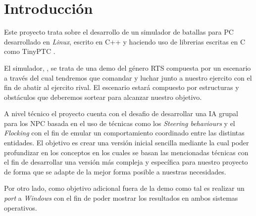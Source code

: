 \chapter{Introducción}
\label{intro}
Este proyecto trata sobre el desarrollo de un simulador de batallas para \ac{PC}
desarrollado en \textit{Linux}, escrito en C++ y haciendo uso de librerias escritas en
C como TinyPTC .

El simulador, , se trata de una demo del género \ac{RTS}
compuesta por un escenario a través del cual tendremos que comandar y luchar junto a
nuestro ejercito con el fin de abatir al ejercito rival. El escenario estará compuesto
por estructuras y obstáculos que deberemos sortear para alcanzar nuestro objetivo.

A nivel técnico el proyecto cuenta con el desafio de desarrollar una \ac{IA} grupal
para los \ac{NPC} basada en el uso de técnicas como los \textit{Steering behaviours} 
y el \textit{Flocking} con el fin de emular un comportamiento coordinado entre las
distintas entidades. El objetivo es crear una versión inicial sencilla mediante la 
cual poder profundizar en los conceptos en los cuales se basan las mencionadas técnicas
con el fin de desarrollar una versión más compleja y específica para nuestro proyecto
de forma que se adapte de la mejor forma posible a nuestras necesidades.

Por otro lado, como objetivo adicional fuera de la demo como tal es realizar
un \textit{port} a \textit{Windows} con el fin de poder mostrar los resultados
en ambos sistemas operativos.



